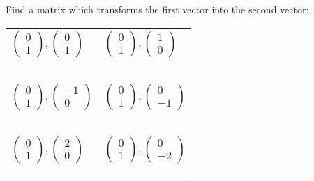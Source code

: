 \documentclass[fontsize=20pt]{scrartcl}
\begin{document}
\newpage
Find a matrix which transforms the first vector into the second vector:
\newline
\newline
\begin{tabular}{p{13cm}p{13cm}}
$\begin{pmatrix}0\\1\end{pmatrix}, \begin{pmatrix}0\\1\end{pmatrix}$
&$\begin{pmatrix}0\\1\end{pmatrix}, \begin{pmatrix}1\\0\end{pmatrix}$
\\\\\\
\\\\\\

$\begin{pmatrix}0\\1\end{pmatrix}, \begin{pmatrix}-1\\0\end{pmatrix}$
&$\begin{pmatrix}0\\1\end{pmatrix}, \begin{pmatrix}0\\-1\end{pmatrix}$
\\\\\\
\\\\\\

$\begin{pmatrix}0\\1\end{pmatrix}, \begin{pmatrix}2\\0\end{pmatrix}$
&$\begin{pmatrix}0\\1\end{pmatrix}, \begin{pmatrix}0\\-2\end{pmatrix}$
\\\\\\

\end{tabular}
\end{document}
